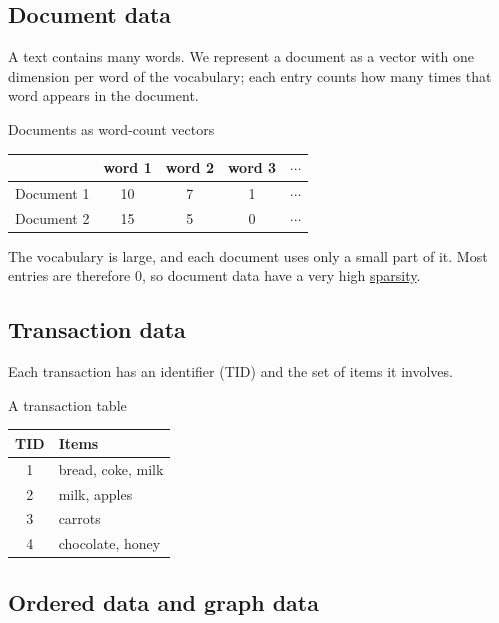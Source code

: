\documentclass[a4paper,12pt,oneside]{report}
\begin{document}
\subsection{Document data}

A text contains many words. We represent a document as a vector with
one dimension per word of the vocabulary; each entry counts how many
times that word appears in the document.

\begin{framedexample}{Documents as word-count vectors}
\label{ex:document-vectors}
\begin{center}
\begin{tabular}{lcccc}
  \toprule
  & word 1 & word 2 & word 3 & $\cdots$\\
  \midrule
  Document 1 & 10 & 7 & 1 & $\cdots$\\
  Document 2 & 15 & 5 & 0 & $\cdots$\\
  \bottomrule
\end{tabular}
\end{center}
The vocabulary is large, and each document uses only a small part of
it. Most entries are therefore $0$, so document data have a very high
\hyperref[def:sparsity]{sparsity}.
\end{framedexample}

\subsection{Transaction data}

Each transaction has an identifier (TID) and the set of items it
involves.

\begin{framedexample}{A transaction table}\label{ex:transactions}
\begin{center}
\begin{tabular}{cl}
  \toprule
  TID & Items\\
  \midrule
  1 & bread, coke, milk\\
  2 & milk, apples\\
  3 & carrots\\
  4 & chocolate, honey\\
  \bottomrule
\end{tabular}
\end{center}
\end{framedexample}

\subsection{Ordered data and graph data}\label{sec:ordered-graph-data}
\end{document}
